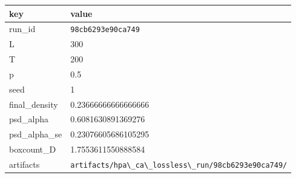 \begin{tabular}{ll}%
\hline%
\textbf{key}&\textbf{value}\\%
\hline%
run\_id&\texttt{98cb6293e90ca749}\\%
L&300\\%
T&200\\%
p&0.5\\%
seed&1\\%
final\_density&0.23666666666666666\\%
psd\_alpha&0.6081630891369276\\%
psd\_alpha\_se&0.23076605686105295\\%
boxcount\_D&1.7553611550888584\\%
artifacts&\texttt{artifacts/hpa\textbackslash{}\_ca\textbackslash{}\_lossless\textbackslash{}\_run/98cb6293e90ca749/}\\%
\hline%
\end{tabular}
